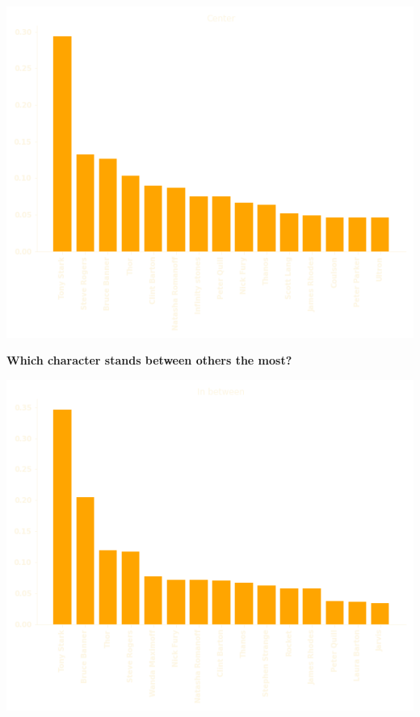 \documentclass{beamer}
\begin{document}
\begin{frame}
    \centering
    \includegraphics[width=\textwidth]{static/degree.png}
\end{frame}

\begin{frame}
    \centering
    \textbf{\large{Which character stands between others the most?}}
\end{frame}

\begin{frame}
    \centering
    \includegraphics[width=\textwidth]{static/between.png}
\end{frame}
\end{document}
